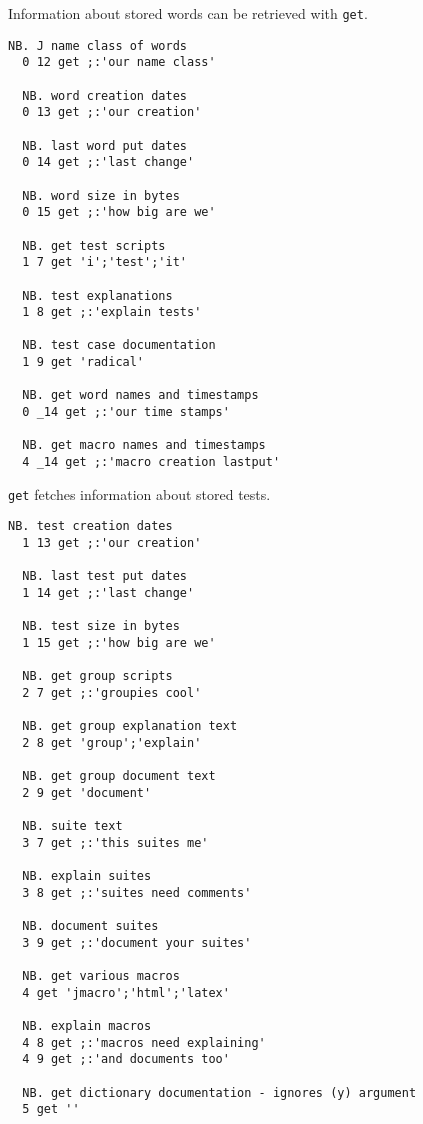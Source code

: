   Information about stored words can be retrieved with \texttt{get}.
  
\begin{lstlisting}[frame=single,framerule=0pt]
  NB. J name class of words
  0 12 get ;:'our name class' 
  
  NB. word creation dates
  0 13 get ;:'our creation'   
  
  NB. last word put dates
  0 14 get ;:'last change'    
  
  NB. word size in bytes
  0 15 get ;:'how big are we' 
  
  NB. get test scripts
  1 7 get 'i';'test';'it'  
     
  NB. test explanations
  1 8 get ;:'explain tests'   
  
  NB. test case documentation
  1 9 get 'radical'
  
  NB. get word names and timestamps 
  0 _14 get ;:'our time stamps'
  
  NB. get macro names and timestamps
  4 _14 get ;:'macro creation lastput'        
\end{lstlisting}         

  \texttt{get} fetches information about stored tests.
  
\begin{lstlisting}[frame=single,framerule=0pt]  
  NB. test creation dates
  1 13 get ;:'our creation'  
  
  NB. last test put dates 
  1 14 get ;:'last change' 
  
  NB. test size in bytes   
  1 15 get ;:'how big are we' 
  
  NB. get group scripts
  2 7 get ;:'groupies cool'  
  
  NB. get group explanation text
  2 8 get 'group';'explain'  
  
  NB. get group document text 
  2 9 get 'document'      
  
  NB. suite text    
  3 7 get ;:'this suites me'    
  
  NB. explain suites    
  3 8 get ;:'suites need comments'  
  
  NB. document suites
  3 9 get ;:'document your suites'  
  
  NB. get various macros
  4 get 'jmacro';'html';'latex'  
  
  NB. explain macros
  4 8 get ;:'macros need explaining'  
  4 9 get ;:'and documents too'
  
  NB. get dictionary documentation - ignores (y) argument
  5 get ''     
\end{lstlisting}


